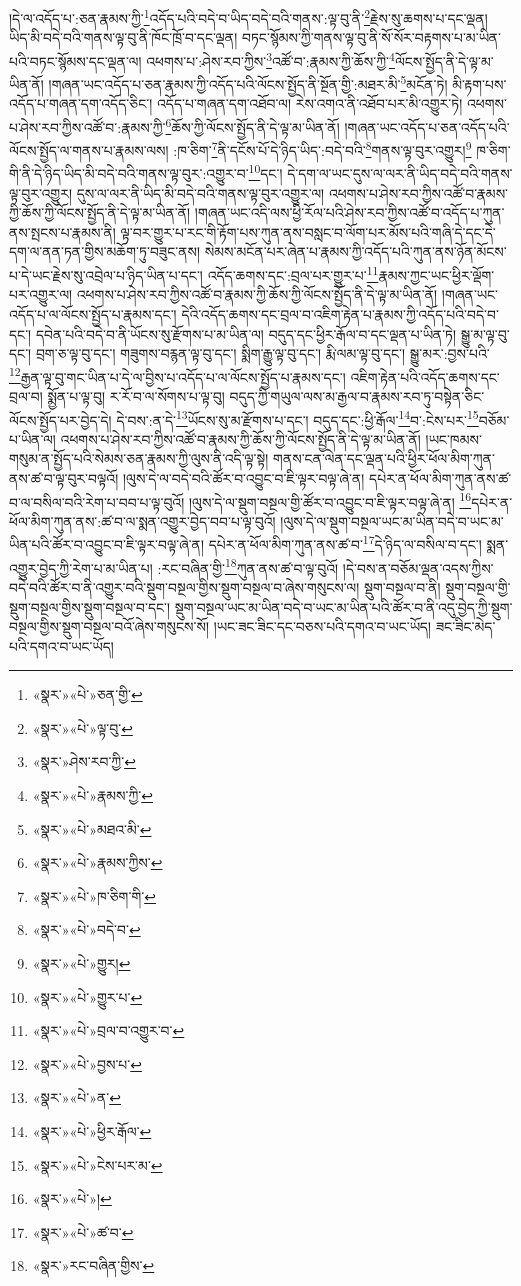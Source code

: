 །དེ་ལ་འདོད་པ་:ཅན་རྣམས་ཀྱི་\footnote{«སྣར་»«པེ་»ཅན་གྱི་}འདོད་པའི་བདེ་བ་ཡིད་བདེ་བའི་གནས་:ལྟ་བུ་ནི་\footnote{«སྣར་»«པེ་»ལྟ་བུ་}རྗེས་སུ་ཆགས་པ་དང་ལྡན། ཡིད་མི་བདེ་བའི་གནས་ལྟ་བུ་ནི་ཁོང་ཁྲོ་བ་དང་ལྡན། བཏང་སྙོམས་ཀྱི་གནས་ལྟ་བུ་ནི་སོ་སོར་བརྟགས་པ་མ་ཡིན་པའི་བཏང་སྙོམས་དང་ལྡན་ལ། འཕགས་པ་:ཤེས་རབ་ཀྱིས་\footnote{«སྣར་»ཤེས་རབ་ཀྱི་}འཚོ་བ་:རྣམས་ཀྱི་ཆོས་ཀྱི་\footnote{«སྣར་»«པེ་»རྣམས་ཀྱི་}ལོངས་སྤྱོད་ནི་དེ་ལྟ་མ་ཡིན་ནོ། །གཞན་ཡང་འདོད་པ་ཅན་རྣམས་ཀྱི་འདོད་པའི་ལོངས་སྤྱོད་ནི་སྔོན་གྱི་:མཐར་མི་\footnote{«སྣར་»«པེ་»མཐའ་མི་}མངོན་ཏེ། མི་རྟག་པས་འདོད་པ་གཞན་དག་འདོད་ཅིང་། འདོད་པ་གཞན་དག་འཐོབ་ལ། རེས་འགའ་ནི་འཐོབ་པར་མི་འགྱུར་ཏེ། འཕགས་པ་ཤེས་རབ་ཀྱིས་འཚོ་བ་:རྣམས་ཀྱི་\footnote{«སྣར་»«པེ་»རྣམས་ཀྱིས་}ཆོས་ཀྱི་ལོངས་སྤྱོད་ནི་དེ་ལྟ་མ་ཡིན་ནོ། །གཞན་ཡང་འདོད་པ་ཅན་འདོད་པའི་ལོངས་སྤྱོད་ལ་གནས་པ་རྣམས་ལས། :ཁ་ཅིག་\footnote{«སྣར་»«པེ་»ཁ་ཅིག་གི་}ནི་དངོས་པོ་དེ་ཉིད་ཡིད་:བདེ་བའི་\footnote{«སྣར་»«པེ་»བདེ་བ་}གནས་ལྟ་བུར་འགྱུར།\footnote{«སྣར་»«པེ་»གྱུར།} ཁ་ཅིག་གི་ནི་དེ་ཉིད་ཡིད་མི་བདེ་བའི་གནས་ལྟ་བུར་:འགྱུར་བ་\footnote{«སྣར་»«པེ་»གྱུར་པ་}དང་། དེ་དག་ལ་ཡང་དུས་ལ་ལར་ནི་ཡིད་བདེ་བའི་གནས་ལྟ་བུར་འགྱུར། དུས་ལ་ལར་ནི་ཡིད་མི་བདེ་བའི་གནས་ལྟ་བུར་འགྱུར་ལ། འཕགས་པ་ཤེས་རབ་ཀྱིས་འཚོ་བ་རྣམས་ཀྱི་ཆོས་ཀྱི་ལོངས་སྤྱོད་ནི་དེ་ལྟ་མ་ཡིན་ནོ། །གཞན་ཡང་འདི་ལས་ཕྱི་རོལ་པའི་ཤེས་རབ་ཀྱིས་འཚོ་བ་འདོད་པ་ཀུན་ནས་སྤངས་པ་རྣམས་ནི། ལྟ་བར་གྱུར་པ་རང་གི་རྟོག་པས་ཀུན་ནས་བསླང་བ་ལོག་པར་མོས་པའི་གཞི་དེ་དང་དེ་དག་ལ་ནན་ཏན་གྱིས་མཆོག་ཏུ་བཟུང་ནས། སེམས་མངོན་པར་ཞེན་པ་རྣམས་ཀྱི་འདོད་པའི་ཀུན་ནས་ཉོན་མོངས་པ་དེ་ཡང་རྗེས་སུ་འབྲེལ་པ་ཉིད་ཡིན་པ་དང་། འདོད་ཆགས་དང་:བྲལ་པར་གྱུར་པ་\footnote{«སྣར་»«པེ་»བྲལ་བ་འགྱུར་བ་}རྣམས་ཀྱང་ཡང་ཕྱིར་ལྡོག་པར་འགྱུར་ལ། འཕགས་པ་ཤེས་རབ་ཀྱིས་འཚོ་བ་རྣམས་ཀྱི་ཆོས་ཀྱི་ལོངས་སྤྱོད་ནི་དེ་ལྟ་མ་ཡིན་ནོ། །གཞན་ཡང་འདོད་པ་ལ་ལོངས་སྤྱོད་པ་རྣམས་དང་། དེའི་འདོད་ཆགས་དང་བྲལ་བ་འཇིག་རྟེན་པ་རྣམས་ཀྱི་འདོད་པའི་བདེ་བ་དང་། དབེན་པའི་བདེ་བ་ནི་ཡོངས་སུ་རྫོགས་པ་མ་ཡིན་ལ། བདུད་དང་ཕྱིར་རྒོལ་བ་དང་ལྡན་པ་ཡིན་ཏེ། སྒྱུ་མ་ལྟ་བུ་དང་། བྲག་ཅ་ལྟ་བུ་དང་། གཟུགས་བརྙན་ལྟ་བུ་དང་། སྨིག་རྒྱུ་ལྟ་བུ་དང་། རྨི་ལམ་ལྟ་བུ་དང་། སྒྱུ་མར་:བྱས་པའི་\footnote{«སྣར་»«པེ་»བྱས་པ་}རྒྱན་ལྟ་བུ་གང་ཡིན་པ་དེ་ལ་བྱིས་པ་འདོད་པ་ལ་ལོངས་སྤྱོད་པ་རྣམས་དང་། འཇིག་རྟེན་པའི་འདོད་ཆགས་དང་བྲལ་བ། སྨྱོན་པ་ལྟ་བུ། ར་རོ་བ་ལ་སོགས་པ་ལྟ་བུ། བདུད་ཀྱི་གཡུལ་ལས་མ་རྒྱལ་བ་རྣམས་རབ་ཏུ་བསྟེན་ཅིང་ལོངས་སྤྱོད་པར་བྱེད་དེ། དེ་བས་:ན་དེ་\footnote{«སྣར་»«པེ་»ན་}ཡོངས་སུ་མ་རྫོགས་པ་དང་། བདུད་དང་:ཕྱི་རྒོལ་\footnote{«སྣར་»«པེ་»ཕྱིར་རྒོལ་}བ་:ངེས་པར་\footnote{«སྣར་»«པེ་»ངེས་པར་མ་}བཅོམ་པ་ཡིན་ལ། འཕགས་པ་ཤེས་རབ་ཀྱིས་འཚོ་བ་རྣམས་ཀྱི་ཆོས་ཀྱི་ལོངས་སྤྱོད་ནི་དེ་ལྟ་མ་ཡིན་ནོ། །ཡང་ཁམས་གསུམ་ན་སྤྱོད་པའི་སེམས་ཅན་རྣམས་ཀྱི་ལུས་ནི་འདི་ལྟ་སྟེ། གནས་ངན་ལེན་དང་ལྡན་པའི་ཕྱིར་ཕོལ་མིག་ཀུན་ནས་ཚ་བ་ལྟ་བུར་བལྟའོ། །ལུས་དེ་ལ་བདེ་བའི་ཚོར་བ་འབྱུང་བ་ཇི་ལྟར་བལྟ་ཞེ་ན། དཔེར་ན་ཕོལ་མིག་ཀུན་ནས་ཚ་བ་ལ་བསིལ་བའི་རེག་པ་བབ་པ་ལྟ་བུའོ། །ལུས་དེ་ལ་སྡུག་བསྔལ་གྱི་ཚོར་བ་འབྱུང་བ་ཇི་ལྟར་བལྟ་ཞེ་ན། \footnote{«སྣར་»«པེ་»།  }དཔེར་ན་ཕོལ་མིག་ཀུན་ནས་:ཚ་བ་ལ་སྨན་འགྱུར་བྱེད་བབ་པ་ལྟ་བུའོ། །ལུས་དེ་ལ་སྡུག་བསྔལ་ཡང་མ་ཡིན་བདེ་བ་ཡང་མ་ཡིན་པའི་ཚོར་བ་འབྱུང་བ་ཇི་ལྟར་བལྟ་ཞེ་ན། དཔེར་ན་ཕོལ་མིག་ཀུན་ནས་ཚ་བ་\footnote{«སྣར་»«པེ་»ཚ་བ་}དེ་ཉིད་ལ་བསིལ་བ་དང་། སྨན་འགྱུར་བྱེད་ཀྱི་རེག་པ་མ་ཡིན་པ། :རང་བཞིན་གྱི་\footnote{«སྣར་»རང་བཞིན་གྱིས་}ཀུན་ནས་ཚ་བ་ལྟ་བུའོ། །དེ་བས་ན་བཅོམ་ལྡན་འདས་ཀྱིས་བདེ་བའི་ཚོར་བ་ནི་འགྱུར་བའི་སྡུག་བསྔལ་གྱིས་སྡུག་བསྔལ་བ་ཞེས་གསུངས་ལ། སྡུག་བསྔལ་བ་ནི། སྡུག་བསྔལ་གྱི་སྡུག་བསྔལ་གྱིས་སྡུག་བསྔལ་བ་དང་། སྡུག་བསྔལ་ཡང་མ་ཡིན་བདེ་བ་ཡང་མ་ཡིན་པའི་ཚོར་བ་ནི་འདུ་བྱེད་ཀྱི་སྡུག་བསྔལ་གྱིས་སྡུག་བསྔལ་བའོ་ཞེས་གསུངས་སོ། །ཡང་ཟང་ཟིང་དང་བཅས་པའི་དགའ་བ་ཡང་ཡོད། ཟང་ཟིང་མེད་པའི་དགའ་བ་ཡང་ཡོད། 